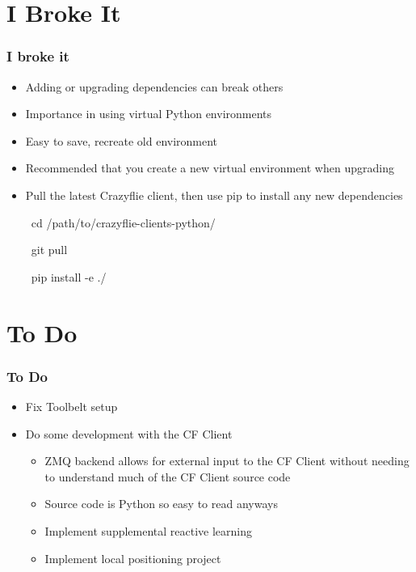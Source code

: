 \documentclass[t, xcolor=dvipsnames]{beamer}
\begin{document}
\section{I Broke It}
\begin{frame}
	\frametitle{I broke it}
	\begin{itemize}
		\item Adding or upgrading dependencies can break others
		\item Importance in using virtual Python environments
		\item Easy to save, recreate old environment
		\item Recommended that you create a new virtual environment when upgrading
		\item Pull the latest Crazyflie client, then use pip to install any new dependencies
			\begin{semiverbatim}
			\ cd /path/to/crazyflie-clients-python/
			\end{semiverbatim}
			\begin{semiverbatim}
			\ git pull
			\end{semiverbatim}
			\begin{semiverbatim}
			\ pip install -e ./
			\end{semiverbatim}
      \end{itemize}
\end{frame}

\section{To Do}
\begin{frame}
	\frametitle{To Do}
	\begin{itemize}
		\item Fix Toolbelt setup
		\item Do some development with the CF Client
		\begin{itemize}
			\item ZMQ backend allows for external input to the CF Client without needing to understand much of the CF Client source code
			\item Source code is Python so easy to read anyways
			\item Implement supplemental reactive learning
			\item Implement local positioning project
		\end{itemize}
	\end{itemize}
\end{frame}
\end{document}
